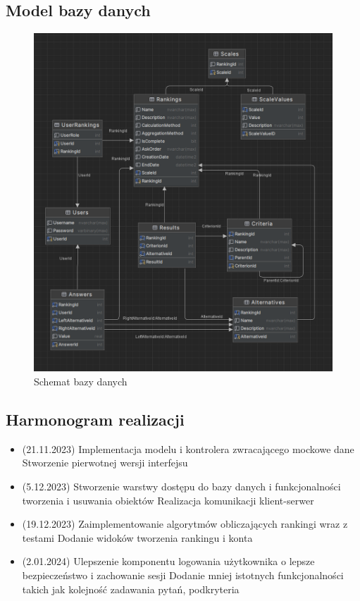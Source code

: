 \documentclass{article}
\begin{document}
\subsection{Model bazy danych}
\begin{figure}[h!]
    \centering
    \includegraphics[width=\linewidth]{db-diagram-vert.PNG}
    \caption{Schemat bazy danych}
\end{figure}

\pagebreak
\subsection{Harmonogram realizacji}
\begin{itemize}
    \item (21.11.2023)
    \subitem Implementacja modelu i kontrolera zwracającego mockowe dane 
    \subitem Stworzenie pierwotnej wersji interfejsu
    \item (5.12.2023)
    \subitem Stworzenie warstwy dostępu do bazy danych i funkcjonalności tworzenia i usuwania obiektów 
    \subitem Realizacja komunikacji klient-serwer
    \item (19.12.2023) 
    \subitem Zaimplementowanie algorytmów obliczających rankingi wraz z testami 
    \subitem Dodanie widoków tworzenia rankingu i konta
    \item (2.01.2024) 
    \subitem Ulepszenie komponentu logowania użytkownika o lepsze bezpieczeństwo i zachowanie sesji 
    \subitem Dodanie mniej istotnych funkcjonalności takich jak kolejność zadawania pytań, podkryteria
\end{itemize}
\end{document}
